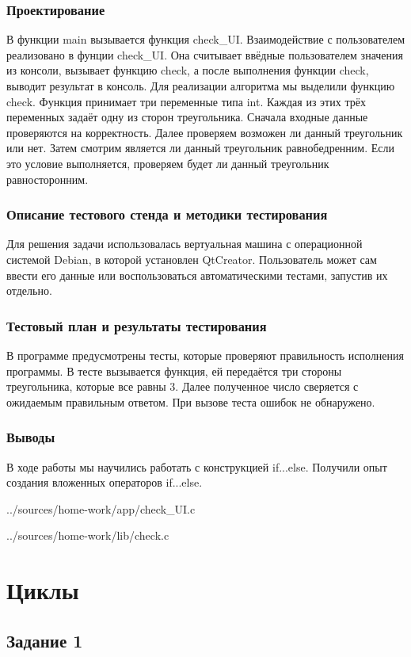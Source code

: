 \documentclass[12pt,a4paper]{report}
\begin{document}
\subsection{Проектирование}
В функции main вызывается функция check\_UI. Взаимодействие с пользователем реализовано в фунции check\_UI. Она считывает ввёдные пользователем значения из консоли, вызывает функцию check, а после выполнения функции check, выводит результат в консоль. Для реализации алгоритма мы выделили функцию check. Функция принимает три переменные типа int. Каждая из этих трёх переменных задаёт одну из сторон треугольника. Сначала входные данные проверяются на корректность. Далее проверяем возможен ли данный треугольник или нет. Затем смотрим является ли данный треугольник равнобедренним. Если это условие выполняется, проверяем будет ли данный треугольник равносторонним.
\subsection{Описание тестового стенда и методики тестирования}
Для решения задачи использовалась вертуальная машина с операционной системой Debian, в которой установлен QtCreator. 
Пользователь может сам ввести его данные или воспользоваться автоматическими тестами, запустив их отдельно.
\subsection{Тестовый план и результаты тестирования}
В программе предусмотрены тесты, которые проверяют правильность исполнения программы. В тесте вызывается функция, ей передаётся три стороны треугольника, которые все равны 3. Далее полученное число сверяется с ожидаемым правильным ответом. При вызове теста ошибок не обнаружено.
\subsection{Выводы}
В ходе работы мы научились работать с конструкцией if...else. Получили опыт создания вложенных операторов if...else.

{../sources/home-work/app/check_UI.c}


{../sources/home-work/lib/check.c}
\chapter{Циклы}
\section{Задание 1}
\end{document}
